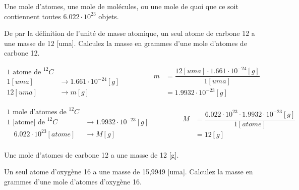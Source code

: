 \documentclass[
  11pt,
  a4paper,
  openany]{book}
\begin{document}
Une mole d'atomes, une mole de molécules, ou une mole de quoi que ce soit contiennent toutes \(6.022\cdot10^{23}\) objets.

\begin{Exercise}

De par la définition de l'unité de masse atomique, un seul atome de carbone 12 a une masse de 12 {[}uma{]}. Calculez la masse en grammes d'une mole d'atomes de carbone 12.


\end{Exercise}

\begin{Answer}
\[ \begin{split}
    \text{1 atome de } ^{12}C &\\
    1 [uma] &\longrightarrow 1.661\cdot10^{-24} [g]\\
    12 [uma] &\longrightarrow m [g]
    \end{split}
    \qquad\qquad
    \begin{split}
        m &= \dfrac{12 [uma] \cdot 1.661 \cdot 10^{-24} [g]}{1 [uma]}\\
        &= 1.9932\cdot 10^{-23} [g]     
    \end{split} \]

\[ \begin{split}
        \text{1 mole d'atomes de }^{12}C &\\
        \text{1 [atome] de }^{12}C &\longrightarrow 1.9932\cdot 10^{-23} [g]\\
        \quad 6.022\cdot 10^{23} [atome] &\longrightarrow M [g]\\
    \end{split}
    \qquad\qquad
    \begin{split}
    M &= \dfrac{6.022\cdot 10^{23} \cdot 1.9932\cdot 10^{-23} [g]}{1 [atome]}\\
    &= 12 [g]
    \end{split} \]

Une mole d'atomes de carbone 12 a une masse de 12 {[}g{]}.

\end{Answer}

\begin{Exercise}

Un seul atome d'oxygène 16 a une masse de 15,9949 {[}uma{]}. Calculez la masse en grammes d'une mole d'atomes d'oxygène 16.


\end{Exercise}
\end{document}
